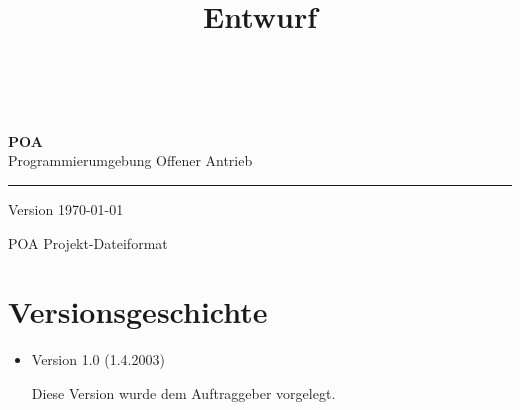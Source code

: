 \documentclass[a4paper,titlepage,12pt,ngerman]{scrbook}
\title {\huge \product\\[0.5cm]\large Entwurf\\[0.5cm] \version
  \\[1cm] \Large \company}
\newcommand\version{Version \today \xspace}
\begin{document}

\begin{titlepage}
\renewcommand{\thefootnote}{\fnsymbol{footnote}}
{\Huge
\raggedright
\textbf{POA} \\
\huge Programmierumgebung Offener Antrieb
\rule{\textwidth}{0.75pt}
\par
}
\begin{flushleft}
\normalsize
\version
\end{flushleft}
\vfill

{\parindent=0cm
\Huge POA Projekt-Dateiformat
}


\setcounter{footnote}{0}
\end{titlepage}


\section*{Versionsgeschichte}

\begin{itemize}

\item Version 1.0 (1.4.2003)

  Diese Version wurde dem Auftraggeber vorgelegt.

\end{itemize}


\tableofcontents


\end{document}
